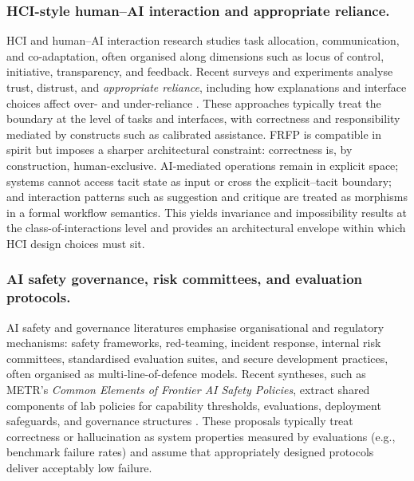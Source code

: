 \documentclass[preprints,accept]{Definitions/mdpi}
\theoremstyle{definition}
\begin{document}
\subsubsection{HCI-style human--AI interaction and appropriate reliance.}
HCI and human--AI interaction research studies task allocation, communication, and co-adaptation, often organised along dimensions such as locus of control, initiative, transparency, and feedback. Recent surveys and experiments analyse trust, distrust, and \emph{appropriate reliance}, including how explanations and interface choices affect over- and under-reliance \cite{Eckhardt2024Reliance,Schemmer2023Appropriate,Visser2025Trust}. These approaches typically treat the boundary at the level of tasks and interfaces, with correctness and responsibility mediated by constructs such as calibrated assistance. FRFP is compatible in spirit but imposes a sharper architectural constraint: correctness is, by construction, human-exclusive. AI-mediated operations remain in explicit space; systems cannot access tacit state as input or cross the explicit--tacit boundary; and interaction patterns such as suggestion and critique are treated as morphisms in a formal workflow semantics. This yields invariance and impossibility results at the class-of-interactions level and provides an architectural envelope within which HCI design choices must sit.

\subsubsection{AI safety governance, risk committees, and evaluation protocols.}
AI safety and governance literatures emphasise organisational and regulatory mechanisms: safety frameworks, red-teaming, incident response, internal risk committees, standardised evaluation suites, and secure development practices, often organised as multi-line-of-defence models. Recent syntheses, such as METR's \emph{Common Elements of Frontier AI Safety Policies}, extract shared components of lab policies for capability thresholds, evaluations, deployment safeguards, and governance structures \cite{METRCommonElements}. These proposals typically treat correctness or hallucination as system properties measured by evaluations (e.g., benchmark failure rates) and assume that appropriately designed protocols deliver acceptably low failure.
\end{document}
